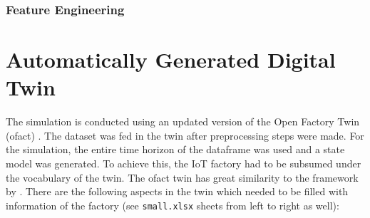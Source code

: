 \subsubsection{Feature Engineering}


\section{Automatically Generated Digital Twin}
\label{sec:automated-digital-twin}

The simulation is conducted using an updated version of the Open Factory Twin (ofact) \parencite{ofact2024}. The dataset was fed in the twin after preprocessing steps were made. For the simulation, the entire time horizon of the dataframe was used and a state model was generated. To achieve this, the IoT factory had to be subsumed under the vocabulary of the twin. The ofact twin has great similarity to the framework by \textcite{Schwede2024}. There are the following aspects in the twin which needed to be filled with information of the factory (see \texttt{small.xlsx} sheets from left to right as well):

